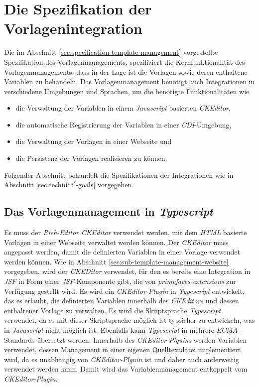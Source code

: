 \section{Die Spezifikation der Vorlagenintegration}
Die im Abschnitt \ref{sec:specification-template-management} vorgestellte Spezifikation des Vorlagenmanagements, spezifiziert die Kernfunktionalität des Vorlagenmanagements, dass in der Lage ist die Vorlagen sowie deren enthaltene Variablen zu behandeln. Das Vorlagenmanagement benötigt auch Integrationen in verschiedene Umgebungen und Sprachen, um die benötigte Funktionalitäten wie
\begin{itemize}
	\item die Verwaltung der Variablen in einem \emph{Javascript} basierten \emph{CKEditor},
	\item die automatische Registrierung der Variablen in einer \emph{CDI}-Umgebung,
	\item die Verwaltung der Vorlagen in einer Webseite und
	\item die Persistenz der Vorlagen realisieren zu können. 
\end{itemize}
Folgender Abschnitt behandelt die Spezifikationen der Integrationen wie in Abschnitt \ref{sec:technical-goals} vorgegeben. 
 
\subsection{Das Vorlagenmanagement in \emph{Typescript}}
\label{sec:sub-typescript-javascript}
Es muss der \emph{Rich-Editor CKEditor} verwendet werden, mit dem \emph{HTML} basierte Vorlagen in einer Webseite verwaltet werden können. Der \emph{CKEditor} muss angepasst werden, damit die definierten Variablen in einer Vorlage verwendet werden können. Wie in Abschnitt \ref{sec:sub-template-management-website} vorgegeben, wird der \emph{CKEDitor} verwendet, für den es bereits eine Integration in \emph{JSF} in Form einer \emph{JSF}-Komponente gibt, die von \emph{primefaces-extensions} zur Verfügung gestellt wird. Es wird ein \emph{CKEditor-Plugin} in \emph{Typescript} entwickelt, das es erlaubt, die definierten Variablen innerhalb des \emph{CKEditors} und dessen enthaltener Vorlage zu verwalten. Es wird die Skriptsprache \emph{Typescript} verwendet, da es mit dieser Skriptsprache möglich ist typsicher zu entwickeln, was in \emph{Javascript} nicht möglich ist. Ebenfalls kann \emph{Typescript} in mehrere \emph{ECMA}-Standards übersetzt werden.
\newline
\newline
Innerhalb des \emph{CKEditor-Plguins} werden Variablen verwendet, dessen Management in einer eigenen Quelltextdatei implementiert wird, da es unabhängig von \emph{CKEditor-Plguin} ist und daher auch anderweitig verwendet werden kann. Damit wird das Variablenmanagement entkoppelt vom \emph{CKEditor-Plugin}.

